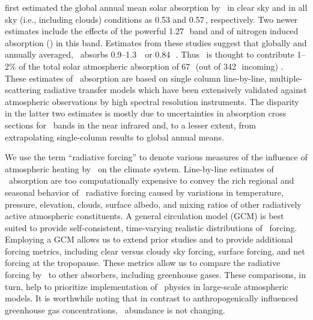 \documentclass[agupp,twoside]{aguplus} %
\begin{document}
\cite{PEP97} first estimated the global annual mean solar
absorption by \OdOd\ in clear sky and in all sky (i.e., including
clouds) conditions as 0.53 and 0.57\,\wxmS, respectively.   
Two newer estimates include the effects of the powerful 1.27\,\um\ band 
and of nitrogen induced absorption (\OdNd) in this band.
Estimates from these studies suggest that globally and annually
averaged, \OdX\ absorbs 0.9--1.3\,\wxmS\ \cite[]{SPS98} or 0.84\,\wxmS\
\cite[]{MCB98}.
Thus \OdX\ is thought to contribute 1--2\% of the total solar
atmospheric absorption of 67\,\wxmS\ (out of 342\,\wxmS\ incoming)
\cite[]{KiT97}.  
These estimates of \OdX\ absorption are based on single column
line-by-line, multiple-scattering radiative transfer models which have
been extensively validated against atmospheric observations by high
spectral resolution instruments.   
The disparity in the latter two estimates is mostly due to
uncertainties in absorption cross sections for \OdX\ bands in the near
infrared and, to a lesser extent, from extrapolating single-column
results to global annual means.

We use the term ``radiative forcing'' to denote various measures of
the influence of atmospheric heating by \OdX\ on the climate system.
Line-by-line estimates of \OdX\ absorption are too computationally 
expensive to convey the rich regional and seasonal behavior of
\OdX\ radiative forcing caused by variations in temperature, pressure,  
elevation, clouds, surface albedo, and mixing ratios of other
radiatively active atmospheric constituents. 
A general circulation model (GCM) is best suited to provide
self-consistent, time-varying realistic distributions of \OdX\
forcing. 
Employing a GCM allows us to extend prior studies and to provide
additional forcing metrics, including clear versus cloudy sky forcing,
surface forcing, and net forcing at the tropopause.
These metrics allow us to compare the radiative forcing by \OdX\ to
other absorbers, including greenhouse gases. 
These comparisons, in turn, help to prioritize implementation of \OdX\
physics in large-scale atmospheric models. 
It is worthwhile noting that in contrast to anthropogenically
influenced greenhouse gas concentrations, \OdX\ abundance is not
changing.   
\end{document}
